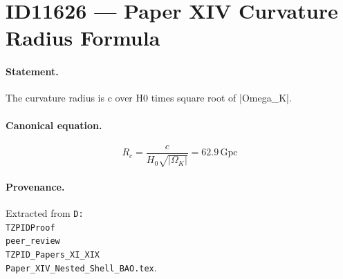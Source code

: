 \section*{ID11626 --- Paper XIV Curvature Radius Formula}

\paragraph{Statement.}
The curvature radius is c over H0 times square root of |Omega_K|.

\paragraph{Canonical equation.}
\[
R_c=\frac{c}{H_0\sqrt{|\Omega_K|}}=62.9\,\mathrm{Gpc}
\]

\paragraph{Provenance.}
Extracted from \texttt{D:\\TZPIDProof\\peer\_review\\TZPID\_Papers\_XI\_XIX\\Paper\_XIV\_Nested\_Shell\_BAO.tex}.
